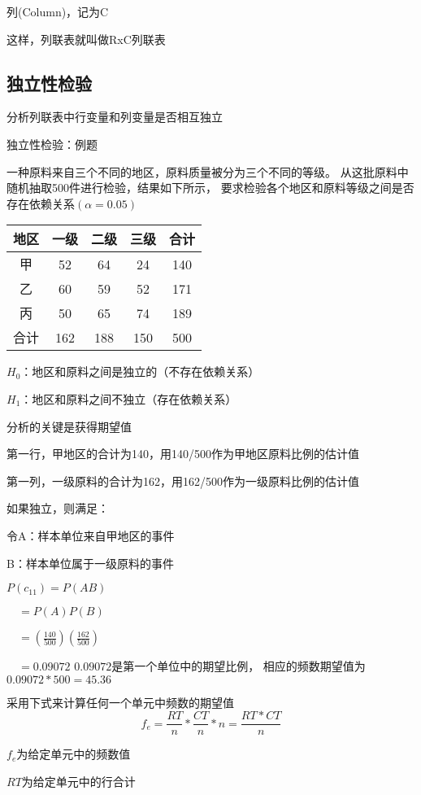 \documentclass[UTF8,10pt]{book}
\begin{document}
列(Column)，记为C 

这样，列联表就叫做RxC列联表	

\subsection{独立性检验}	
分析列联表中行变量和列变量是否相互独立	

独立性检验：例题 

一种原料来自三个不同的地区，原料质量被分为三个不同的等级。
从这批原料中随机抽取500件进行检验，结果如下所示，
要求检验各个地区和原料等级之间是否存在依赖关系$(\alpha = 0.05)$ 


\begin{tabular}{|c|c|c|c|c|}%
    \hline  %
    地区 & 一级 & 二级 &  三级 & 合计  \\
    \hline  %
    甲 & 52 & 64 & 24 & 140   \\
    \hline %
    乙 &60 &59 &52 &171  \\
    \hline
    丙 &50 &65 &74 &189 \\
    \hline
    合计&162& 188 &150& 500\\
    \hline
    \end{tabular}


$H_0$：地区和原料之间是独立的（不存在依赖关系） 

$H_1$：地区和原料之间不独立（存在依赖关系） 

分析的关键是获得期望值 

第一行，甲地区的合计为140，用140/500作为甲地区原料比例的估计值 

第一列，一级原料的合计为162，用162/500作为一级原料比例的估计值 

如果独立，则满足： 

令A：样本单位来自甲地区的事件 

B：样本单位属于一级原料的事件 

$P(c_{11}) = P(AB)$ 

$\quad = P(A)P(B)$ 

$\quad = (\frac{140}{500})( \frac{162}{500})$ 

$\quad = 0.09072$ $ 0.09072$是第一个单位中的期望比例，
相应的频数期望值为$0.09072*500 = 45.36$ 

采用下式来计算任何一个单元中频数的期望值 
$$f_e= \frac{RT}{n}*\frac{CT}{n} * n = \frac{RT*CT}{n}$$ 

$f_e$为给定单元中的频数值 

$RT$为给定单元中的行合计 
\end{document}
